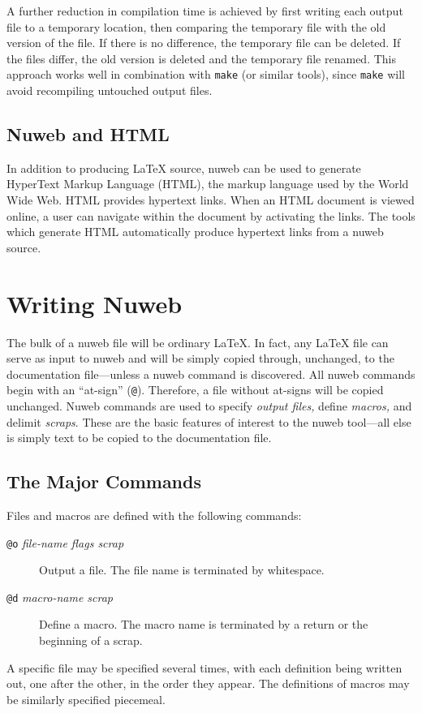 \documentclass{report}
\begin{document}
A further reduction in compilation time is achieved by first
writing each output file to a temporary location, then comparing the
temporary file with the old version of the file. If there is no
difference, the temporary file can be deleted. If the files differ,
the old version is deleted and the temporary file renamed. This
approach works well in combination with \verb|make| (or similar tools),
since \verb|make| will avoid recompiling untouched output files.

\subsection{Nuweb and HTML}

In addition to producing {\LaTeX} source, nuweb can be used to
generate HyperText Markup Language (HTML), the markup language used by
the World Wide Web.  HTML provides hypertext links.  When an HTML
document is viewed online, a user can navigate within the document by
activating the links.  The tools which generate HTML automatically
produce hypertext links from a nuweb source.


\section{Writing Nuweb}

The bulk of a nuweb file will be ordinary \LaTeX\@. In fact, any
{\LaTeX} file can serve as input to nuweb and will be simply copied
through, unchanged, to the documentation file---unless a nuweb command
is discovered. All nuweb commands begin with an ``at-sign''
(\verb|@|).  Therefore, a file without at-signs will be copied
unchanged.  Nuweb commands are used to specify {\em output files,}
define {\em macros,} and delimit {\em scraps}. These are the basic
features of interest to the nuweb tool---all else is simply text to be
copied to the documentation file.

\subsection{The Major Commands}

Files and macros are defined with the following commands:
\begin{description}
\item[{\tt @o} {\em file-name flags scrap\/}] Output a file. The file name is
  terminated by whitespace.
\item[{\tt @d} {\em macro-name scrap\/}] Define a macro. The macro name
  is terminated by a return or the beginning of a scrap.
\end{description}
A specific file may be specified several times, with each definition
being written out, one after the other, in the order they appear.
The definitions of macros may be similarly specified piecemeal.
\end{document}
